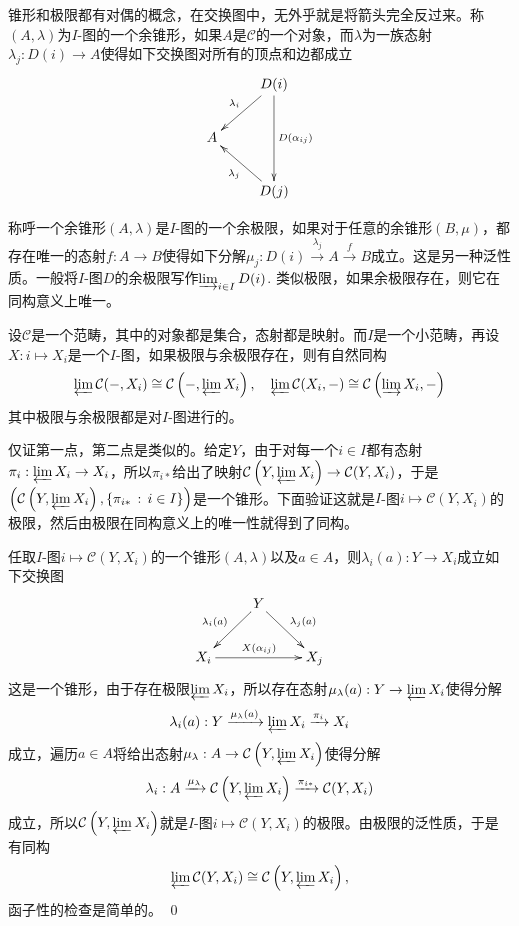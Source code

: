 \para 锥形和极限都有对偶的概念，在交换图中，无外乎就是将箭头完全反过来。称$(A,\lambda)$为$I$-图的一个{余锥形}，如果$A$是$\mathcal{C}$的一个对象，而$\lambda$为一族态射$\lambda_{j}:D(i)\to A$使得如下交换图对所有的顶点和边都成立
\[
	\xymatrix{
		&D(i)\ar[ld]_{\lambda_i}\ar[dd]^{D(\alpha_{ij})}\\
		A&\\
		&D(j)\ar[lu]^{\lambda_j}
	}
\]

称呼一个余锥形$(A,\lambda)$是$I$-图的一个{余极限}，如果对于任意的余锥形$(B,\mu)$，都存在唯一的态射$f:A\to B$使得如下分解$\mu_j:D(i)\xrightarrow{\lambda_j}A\xrightarrow{f}B$成立。这是另一种泛性质。一般将$I$-图$D$的余极限写作$\varinjlim_{i\in I} D(i)$. 类似极限，如果余极限存在，则它在同构意义上唯一。

\pro \label{homlimit}设$\mathcal{C}$是一个范畴，其中的对象都是集合，态射都是映射。而$I$是一个小范畴，再设$X:i\mapsto X_i$是一个$I$-图，如果极限与余极限存在，则有自然同构
\[
	\varprojlim \mathcal{C}(-,X_i)\cong \mathcal{C}\left(-,\varprojlim X_i\right),\quad \varprojlim \mathcal{C}(X_i,-)\cong  \mathcal{C}\left(\varinjlim X_i,-\right)
\]
其中极限与余极限都是对$I$-图进行的。

\proof
	仅证第一点，第二点是类似的。给定$Y$，由于对每一个$i\in I$都有态射$\pi_i: \varprojlim X_i\to X_i$，所以$\pi_{i*}$给出了映射$\mathcal{C}\left(Y,\varprojlim X_i\right)\to \mathcal{C}(Y,X_i)$，于是$\left(\mathcal{C}\left(Y,\varprojlim X_i\right),\{\pi_{i*}\,:\, i\in I\}\right)$是一个锥形。下面验证这就是$I$-图$i\mapsto \mathcal{C}(Y,X_i)$的极限，然后由极限在同构意义上的唯一性就得到了同构。

	任取$I$-图$i\mapsto \mathcal{C}(Y,X_i)$的一个锥形$(A,\lambda)$以及$a\in A$，则$\lambda_i(a):Y\to X_i$成立如下交换图
	\[
		\xymatrix{
			&Y \ar[dl]_{\lambda_{i}(a)}\ar[dr]^{\lambda_{j}(a)}&\\
			X_i\ar[rr]^{X(\alpha_{ij})}&&X_j
		}
	\]
	这是一个锥形，由于存在极限$\varprojlim X_i$，所以存在态射$\mu_\lambda(a):Y\to \varprojlim X_i$使得分解
	\[
		\lambda_i(a):Y\xrightarrow{\mu_\lambda(a)}\varprojlim X_i\xrightarrow{\pi_i}X_i
	\]
	成立，遍历$a\in A$将给出态射$\mu_\lambda:A\to \mathcal{C}\left(Y,\varprojlim X_i\right)$使得分解
	\[
	\lambda_i: A\xrightarrow{\mu_\lambda}\mathcal{C}\left(Y,\varprojlim X_i\right)\xrightarrow{\pi_{i*}}\mathcal{C}(Y,X_i)
	\]
	成立，所以$\mathcal{C}\left(Y,\varprojlim X_i\right)$就是$I$-图$i\mapsto \mathcal{C}(Y,X_i)$的极限。由极限的泛性质，于是有同构
	\[
		\varprojlim \mathcal{C}(Y,X_i)\cong \mathcal{C}\left(Y,\varprojlim X_i\right),
	\]
	函子性的检查是简单的。
\qed

